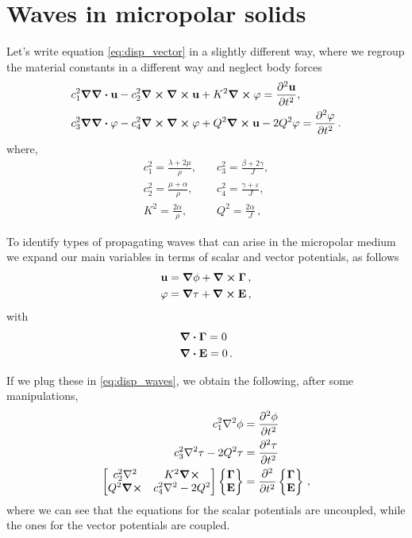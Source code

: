 \documentclass[12pt]{article}
\begin{document}
\section{Waves in micropolar solids}
Let's write equation \eqref{eq:disp_vector} in a slightly different way, where we regroup the material constants in a different way and neglect body forces
\begin{subequations}
  \begin{align}\label{eq:disp_waves}
    & c_1^2 \grad\div\vb{u} - c_2^2\curl\curl\vb{u} + K^2 \curl\vb{\varphi} =  \pdv[2]{\vb{u}}{t}, \\
    & c_3^2 \grad\div\vb{\varphi} - c_4^2 \curl\curl\vb{\varphi} +  Q^2 \curl\vb{u} - 2Q^2 \vb{\varphi} = \pdv[2]{\vb{\varphi}}{t}\, .
  \end{align}
\end{subequations}
where,
\begin{equation*}
\begin{split}
c_1^2 = \frac{\lambda +2\mu}{\rho},\quad &c_3^2 =\frac{\beta +2\gamma}{J},\\
c_2^2 = \frac{\mu +\alpha}{\rho},\quad &c_4^2 =\frac{\gamma + \varepsilon}{J},\\
K^2= \frac{2\alpha}{\rho},\quad &Q^2 =\frac{2\alpha}{J} \, ,
\end{split}
\end{equation*}


To identify types of propagating waves that can arise in the micropolar medium we expand our main variables in terms of scalar and vector potentials, as follows
\begin{align*}
\vb{u} &= \grad \phi + \curl\vb{\Gamma}\, ,\\
\vb{\varphi} &= \grad \tau + \curl\vb{E}\, ,
\end{align*}
with
\begin{align*}
&\div\vb{\Gamma} = 0\\
&\div\vb{E} = 0\, .
\end{align*}

If we plug these in \eqref{eq:disp_waves}, we obtain the following, after some manipulations,
\begin{subequations}
  \begin{align}\label{eq:potential_waves}
    c_1^2 \laplacian\phi &= \pdv[2]{\phi}{t}\\
    c_3^2 \laplacian\tau - 2Q^2\tau &= \pdv[2]{\tau}{t}\\
    \begin{bmatrix}
      c_2^2\laplacian &K^2\curl\\
      Q^2\curl &c_4^2\laplacian - 2Q^2
    \end{bmatrix}
    \begin{Bmatrix} \vb{\Gamma}\\ \vb{E}\end{Bmatrix} &=
    \pdv[2]{t} \begin{Bmatrix} \vb{\Gamma}\\ \vb{E}\end{Bmatrix}\, ,
  \end{align}
\end{subequations}
where we can see that the equations for the scalar potentials are uncoupled, while the ones
for the vector potentials are coupled.
\end{document}
